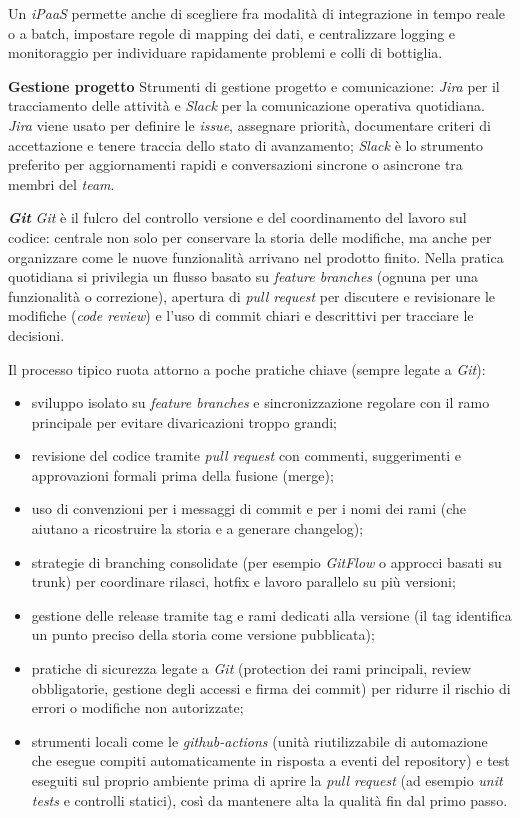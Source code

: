 Un \emph{iPaaS} permette anche di scegliere fra modalità di integrazione 
in tempo reale o a batch, impostare regole di mapping dei dati, e centralizzare logging e monitoraggio per individuare rapidamente problemi e colli di bottiglia.

\medskip
\noindent\textbf{Gestione progetto}
Strumenti di gestione progetto e comunicazione: \emph{Jira} per il tracciamento delle attività e \emph{Slack} per la comunicazione operativa quotidiana. \emph{Jira} 
viene usato per definire le \emph{issue}, assegnare priorità, documentare criteri di accettazione e tenere traccia dello stato di avanzamento; \emph{Slack} 
è lo strumento preferito per aggiornamenti rapidi e conversazioni sincrone o asincrone tra membri del \emph{team}.

\medskip
\noindent\textbf{\emph{Git}}
\emph{Git} è il fulcro del controllo versione e del coordinamento del lavoro sul codice: 
centrale non solo per conservare la storia delle modifiche, ma anche per organizzare come le nuove funzionalità arrivano nel prodotto finito. 
Nella pratica quotidiana si privilegia un flusso basato su \emph{feature branches} (ognuna per una funzionalità o correzione), 
apertura di \emph{pull request} per discutere e revisionare le modifiche (\emph{code review}) e l’uso di commit chiari e descrittivi per tracciare le decisioni.

Il processo tipico ruota attorno a poche pratiche chiave (sempre legate a \emph{Git}):
\begin{itemize}
\item sviluppo isolato su \emph{feature branches} e sincronizzazione regolare con il ramo principale per evitare divaricazioni troppo grandi;
\item revisione del codice tramite \emph{pull request} con commenti, suggerimenti e approvazioni formali prima della fusione (merge);
\item uso di convenzioni per i messaggi di commit e per i nomi dei rami (che aiutano a ricostruire la storia e a generare changelog);
\item strategie di branching consolidate (per esempio \emph{GitFlow} o approcci basati su trunk) per coordinare rilasci, hotfix e lavoro parallelo su più versioni;
\item gestione delle release tramite tag e rami dedicati alla versione (il tag identifica un punto preciso della storia come versione pubblicata);
\item pratiche di sicurezza legate a \emph{Git} (protection dei rami principali, review obbligatorie, gestione degli accessi e firma dei commit) per ridurre il rischio di errori o modifiche non autorizzate;
\item strumenti locali come le \emph{github-actions} (unità riutilizzabile di automazione che esegue compiti automaticamente in risposta a eventi del repository) e test eseguiti sul proprio ambiente prima di aprire la \emph{pull request} (ad esempio \emph{unit tests} e controlli statici), così da mantenere alta la qualità fin dal primo passo.
\end{itemize}

